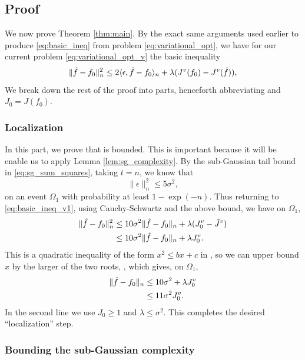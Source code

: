 \documentclass{article}
\begin{document}
\subsection{Proof}

We now prove Theorem \ref{thm:main}. By the exact same arguments used earlier to
produce \eqref{eq:basic_ineq} from problem \eqref{eq:variational_opt}, we have
for our current problem \eqref{eq:variational_opt_v} the basic inequality     
\begin{equation}
\label{eq:basic_ineq_v1}
\|\hat{f} - f_0\|_n^2 \leq 2 \langle \epsilon, \hat{f}-f_0 \rangle_n + \lambda (J^v(f_0)
- J^v(\hat{f})), 
\end{equation} 
We break down the rest of the proof into parts, henceforth abbreviating
 and $J_0 = J(f_0)$.     

\subsubsection{Localization}

In this part, we prove that  is bounded. This is
important because it will be enable us to apply Lemma
\ref{lem:sg_complexity}. By the sub-Gaussian tail bound in
\eqref{eq:sg_sum_squares}, taking $t=n$, we know that    
\[
\|\epsilon\|_n^2 \leq 5\sigma^2,
\]
on an event $\Omega_1$ with probability at least $1-\exp(-n)$. Thus returning to 
\eqref{eq:basic_ineq_v1}, using Cauchy-Schwartz and the above bound, we have on
$\Omega_1$, 
\begin{align*}
\|\hat{f}-f_0\|_n^2 &\leq 10\sigma^2 \|\hat{f}-f_0\|_n + \lambda (J_0^v - {\hat J}^v) \\ 
&\leq 10 \sigma^2 \|\hat{f}-f_0\|_n + \lambda J_0^v.
\end{align*}
This is a quadratic inequality of the form $x^2 \leq bx + c$ in , so we can upper bound $x$ by the larger of the two roots,
, which gives, on
$\Omega_1$, 
\begin{align}
\nonumber
\|\hat{f}-f_0\|_n &\leq 10\sigma^2 + \lambda J_0^v \\
\label{eq:localization}
&\leq 11 \sigma^2 J_0^v.
\end{align}
In the second line we use $J_0\geq 1$ and $\lambda \leq \sigma^2$. This
completes the desired ``localization'' step.    

\subsubsection{Bounding the sub-Gaussian complexity}
\end{document}
